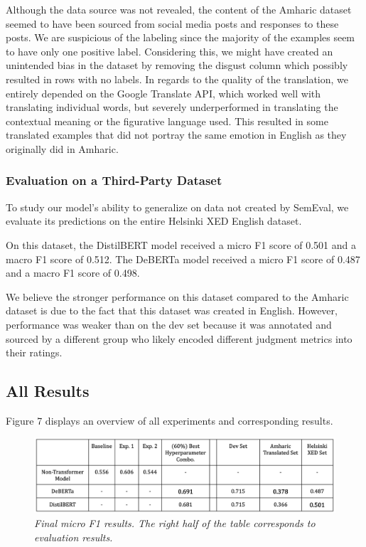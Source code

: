 \documentclass[11pt]{article}
\begin{document}
Although the data source was not revealed, the content of the Amharic dataset seemed to have been sourced from social media posts and responses to these posts. We are suspicious of the labeling since the majority of the examples seem to have only one positive label. Considering this, we might have created an unintended bias in the dataset by removing the disgust column which possibly resulted in rows with no labels. In regards to the quality of the translation, we entirely depended on the Google Translate API, which worked well with translating individual words, but severely underperformed in translating the contextual meaning or the figurative language used. This resulted in some translated examples that did not portray the same emotion in English as they originally did in Amharic.


\subsubsection{Evaluation on a Third-Party Dataset}

To study our model’s ability to generalize on data not created by SemEval, we evaluate its predictions on the entire Helsinki XED English dataset.

On this dataset, the DistilBERT model received a micro F1 score of 0.501 and a macro F1 score of 0.512. The DeBERTa model received a micro F1 score of 0.487 and a macro F1 score of 0.498.

We believe the stronger performance on this dataset compared to the Amharic dataset is due to the fact that this dataset was created in English. However, performance was weaker than on the dev set because it was annotated and sourced by a different group who likely encoded different judgment metrics into their ratings.


\subsection{All Results}

Figure 7 displays an overview of all experiments and corresponding results.

\begin{figure}
    \centering
    \includegraphics[width=\textwidth]{results_table_2}
    \caption{\textit{Final micro F1 results. The right half of the table corresponds to evaluation results.}}
\end{figure}
\end{document}

